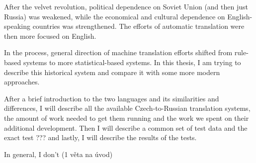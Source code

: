 After the velvet revolution, political dependence on Soviet Union (and then just Russia) was weakened, while the economical and cultural dependence on English-speaking countries was strengthened. The efforts of automatic translation were then more focused on English. 

In the process, general direction of machine translation efforts shifted from rule-based systems to more statistical-based systems. In this thesis, I am trying to describe this historical system and compare it with some more modern approaches.


After a brief introduction to the two languages and its similarities and differences, I will describe all the available Czech-to-Russian translation systems, the amount of work needed to get them running and the work we spent on their additional development. Then I will describe a common set of test data and the exact test ??? and lastly, I will describe the results of the tests.

In general, I don't (1 věta na úvod)
